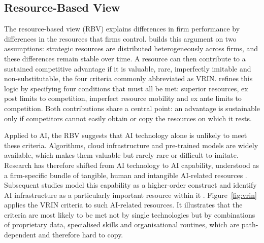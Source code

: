 \subsection{Resource-Based View}
\label{sec:rbv}

The resource-based view (RBV) explains differences in firm performance by differences in the resources that firms control. \textcite{barney1991} builds this argument on two assumptions: strategic resources are distributed heterogeneously across firms, and these differences remain stable over time. A resource can then contribute to a sustained competitive advantage if it is valuable, rare, imperfectly imitable and non-substitutable, the four criteria commonly abbreviated as VRIN. \textcite{peteraf1993} refines this logic by specifying four conditions that must all be met: superior resources, ex post limits to competition, imperfect resource mobility and ex ante limits to competition. Both contributions share a central point: an advantage is sustainable only if competitors cannot easily obtain or copy the resources on which it rests.

Applied to AI, the RBV suggests that AI technology alone is unlikely to meet these criteria. Algorithms, cloud infrastructure and pre-trained models are widely available, which makes them valuable but rarely rare or difficult to imitate. Research has therefore shifted from AI technology to AI capability, understood as a firm-specific bundle of tangible, human and intangible AI-related resources \parencite{mikalef2021ai}. Subsequent studies model this capability as a higher-order construct and identify AI infrastructure as a particularly important resource within it \parencite{fossowamba2024}. Figure~\ref{fig:vrin} applies the VRIN criteria to such AI-related resources. It illustrates that the criteria are most likely to be met not by single technologies but by combinations of proprietary data, specialised skills and organisational routines, which are path-dependent and therefore hard to copy.

